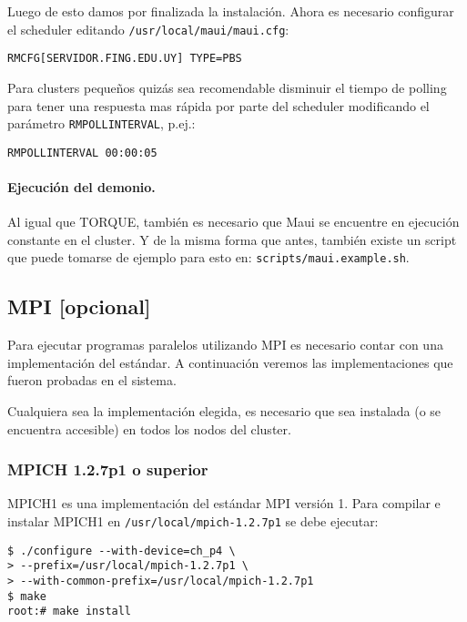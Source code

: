 \documentclass[a4paper,10pt,spanish]{article}
\begin{document}
Luego de esto damos por finalizada la instalaci\'{o}n. Ahora es necesario configurar el scheduler editando \mbox{\texttt{/usr/local/maui/maui.cfg}}:

\begin{verbatim}
RMCFG[SERVIDOR.FING.EDU.UY] TYPE=PBS
\end{verbatim}

Para clusters peque\~{n}os quiz\'{a}s sea recomendable disminuir el tiempo de polling para tener una respuesta mas r\'{a}pida por parte del scheduler modificando el par\'{a}metro \texttt{RMPOLLINTERVAL}, p.ej.:

\begin{verbatim}
RMPOLLINTERVAL 00:00:05
\end{verbatim}

\paragraph{Ejecuci\'{o}n del demonio.}

Al igual que TORQUE, tambi\'{e}n es necesario que Maui se encuentre en ejecuci\'{o}n constante en el cluster. Y de la misma forma que antes, tambi\'{e}n existe un script que puede tomarse de ejemplo para esto en: \mbox{\texttt{scripts/maui.example.sh}}.

\subsection{MPI \small{[opcional]}}

Para ejecutar programas paralelos utilizando MPI es necesario contar con una implementaci\'{o}n del est\'{a}ndar. A continuaci\'{o}n veremos las implementaciones que fueron probadas en el sistema.

Cualquiera sea la implementaci\'{o}n elegida, es necesario que sea instalada (o se encuentra accesible) en todos los nodos del cluster.

\subsubsection{MPICH 1.2.7p1 o superior}

MPICH1\cite{mpich1} es una implementaci\'{o}n del est\'{a}ndar MPI versi\'{o}n 1. Para compilar e instalar MPICH1 en \mbox{\texttt{/usr/local/mpich-1.2.7p1}} se debe ejecutar:

\begin{verbatim}
$ ./configure --with-device=ch_p4 \
> --prefix=/usr/local/mpich-1.2.7p1 \
> --with-common-prefix=/usr/local/mpich-1.2.7p1 
$ make 
root:# make install
\end{verbatim}
\end{document}
